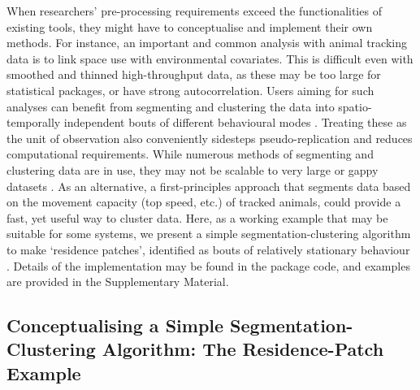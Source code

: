 When researchers' pre-processing requirements exceed the functionalities of existing tools, they might have to conceptualise and implement their own methods.
For instance, an important and common analysis with animal tracking data is to link space use with environmental covariates.
This is difficult even with smoothed and thinned high-throughput data, as these may be too large for statistical packages, or have strong autocorrelation.
Users aiming for such analyses can benefit from segmenting and clustering the data into spatio-temporally independent bouts of different behavioural modes \citep{patin2020a}.
Treating these as the unit of observation also conveniently sidesteps pseudo-replication and reduces computational requirements.
While numerous methods of segmenting and clustering data are in use, they may not be scalable to very large or gappy datasets \citep{patin2020a, langrock2012, michelot2016}.
As an alternative, a first-principles approach that segments data based on the movement capacity (top speed, etc.) of tracked animals, could provide a fast, yet useful way to cluster data.
Here, as a working example that may be suitable for some systems, we present a simple segmentation-clustering algorithm to make `residence patches', identified as bouts of relatively stationary behaviour \citep[][]{barraquand2008,bijleveld2016,oudman2018}.
Details of the implementation may be found in the package code, and examples are provided in the Supplementary Material.

\subsection*{Conceptualising a Simple Segmentation-Clustering Algorithm: The Residence-Patch Example}

